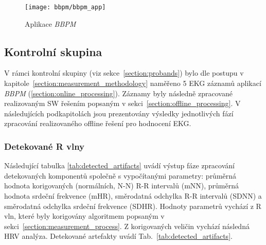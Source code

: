 \begin{figure}[H]
	\begin{center}
		\texttt{[image: bbpm/bbpm\_app]}
		\caption{Aplikace \textit{BBPM}}
		\label{fig:results_bbpm}
	\end{center}
\end{figure}

\clearpage

\subsection{Kontrolní skupina}
\label{sections:results_probands}
V rámci kontrolní skupiny (viz sekce~\ref{section:probands}) bylo dle postupu v
kapitole~\ref{section:measurement_methodology} naměřeno 5 EKG záznamů aplikací
\textit{BBPM} (\ref{section:online_processing}). Záznamy byly následně
zpracované realizovaným SW řešením popsaným v
sekci~\ref{section:offline_processing}. V následujících podkapitolách jsou
prezentovány výsledky jednotlivých fází zpracování realizovaného offline řešení
pro hodnocení EKG.

\subsubsection{Detekované R vlny}
Následující tabulka \ref{tab:detected_artifacts} uvádí výstup fáze zpracování
detekovaných komponentů společně s vypočítanými parametry: průměrná hodnota
korigovaných (normálních, N-N) R-R intervalů (mNN), průměrná hodnota srdeční
frekvence (mHR), směrodatná odchylka R-R intervalů (SDNN) a směrodatná odchylka
srdeční frekvence (SDHR). Hodnoty parametrů vychází z R vln, které byly
korigovány algoritmem popsaným v sekci~\ref{section:measurement_process}. Z
korigovaných veličin vychází následná HRV analýza. Detekované artefakty uvádí
Tab.~\ref{tab:detected_artifacts}.

